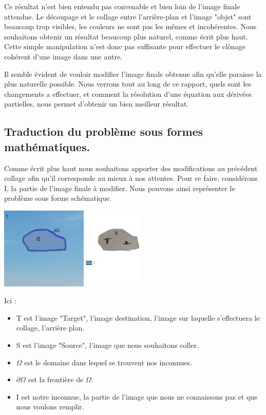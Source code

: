 Ce résultat n'est bien entendu pas convenable et bien loin de l'image finale attendue. Le découpage et le collage entre l'arrière-plan et l'image "objet" sont beaucoup trop visibles, les couleurs ne sont pas les mêmes et incohérentes. Nous souhaitons obtenir un résultat beaucoup plus naturel, comme écrit plus haut. Cette simple manipulation n'est donc pas suffisante pour effectuer le clônage cohérent  d'une image dans une autre. \newline

Il semble évident de vouloir modifier l'image finale obtenue afin qu'elle paraisse la plus naturelle possible. Nous verrons tout au long de ce rapport, quels sont les changements a effectuer, et comment la résolution d'une équation aux dérivées partielles, nous permet d'obtenir un bien meilleur résultat. 


\subsection{Traduction du problème sous formes mathématiques.}

Comme écrit plus haut nous souhaitons apporter des modifications au précédent collage afin qu'il corresponde au mieux à nos attentes. Pour ce faire, considérons I, la partie de l'image finale à modifier. Nous pouvons ainsi représenter le problème sous forme schématique. 
\begin{center}
    \includegraphics[width = 200pt]{Images/Schee.jpg}
\end{center}

Ici : 
\begin{itemize}
    \item T est l'image "Target", l'image destination, l'image sur laquelle s'effectuera le collage, l'arrière plan. 
    \item S est l'image "Source", l'image que nous souhaitons coller.
    \item $\Omega$ est le domaine dans lequel se trouvent nos inconnues.
    \item $\partial \Omega$ est la frontière de $\Omega$.
    \item I est notre inconnue, la partie de l'image que nous ne connaissons pas et que nous voulons remplir.
\end{itemize}

